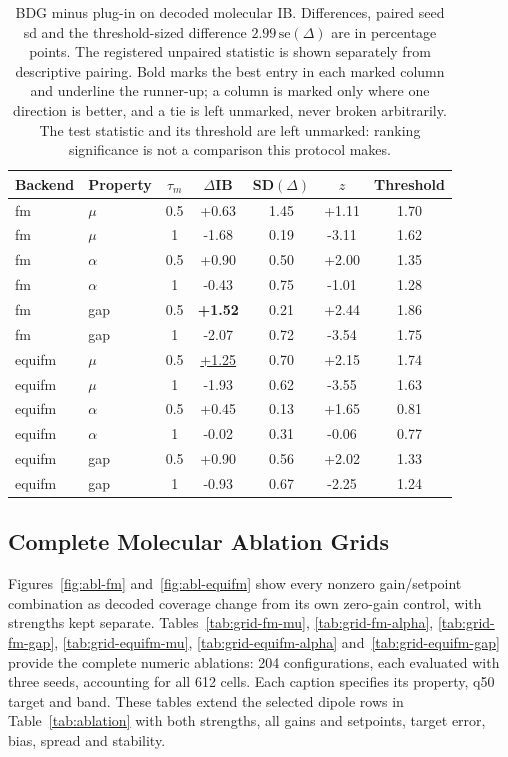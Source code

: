 \documentclass{article}
\begin{document}
\begin{table}[!htbp]
\centering\small
\caption{BDG minus plug-in on decoded molecular IB. Differences, paired seed sd and the threshold-sized difference $2.99\,\mathrm{se}(\Delta)$ are in percentage points. The registered unpaired statistic is shown separately from descriptive pairing. Bold marks the best entry in each marked column and underline the runner-up; a column is marked only where one direction is better, and a tie is left unmarked, never broken arbitrarily. The test statistic and its threshold are left unmarked: ranking significance is not a comparison this protocol makes.}
\label{tab:contrasts}
\begin{tabular}{llccccc}
\toprule
Backend & Property & $\tau_m$ & $\Delta$IB & SD$(\Delta)$ & $z$ & Threshold\\
\midrule
fm & $\mu$ & 0.5 & +0.63 & 1.45 & +1.11 & 1.70\\
fm & $\mu$ & 1 & -1.68 & 0.19 & -3.11 & 1.62\\
fm & $\alpha$ & 0.5 & +0.90 & 0.50 & +2.00 & 1.35\\
fm & $\alpha$ & 1 & -0.43 & 0.75 & -1.01 & 1.28\\
fm & gap & 0.5 & \textbf{+1.52}& 0.21 & +2.44 & 1.86\\
fm & gap & 1 & -2.07 & 0.72 & -3.54 & 1.75\\
equifm & $\mu$ & 0.5 & \underline{+1.25}& 0.70 & +2.15 & 1.74\\
equifm & $\mu$ & 1 & -1.93 & 0.62 & -3.55 & 1.63\\
equifm & $\alpha$ & 0.5 & +0.45 & 0.13 & +1.65 & 0.81\\
equifm & $\alpha$ & 1 & -0.02 & 0.31 & -0.06 & 0.77\\
equifm & gap & 0.5 & +0.90 & 0.56 & +2.02 & 1.33\\
equifm & gap & 1 & -0.93 & 0.67 & -2.25 & 1.24\\
\bottomrule
\end{tabular}
\end{table}

\subsection{Complete Molecular Ablation Grids}\label{app:ablations}
Figures~\ref{fig:abl-fm} and~\ref{fig:abl-equifm} show every nonzero gain/setpoint combination as decoded coverage change from its own zero-gain control, with strengths kept separate. Tables~\ref{tab:grid-fm-mu}, \ref{tab:grid-fm-alpha}, \ref{tab:grid-fm-gap}, \ref{tab:grid-equifm-mu}, \ref{tab:grid-equifm-alpha} and~\ref{tab:grid-equifm-gap} provide the complete numeric ablations: 204 configurations, each evaluated with three seeds, accounting for all 612 cells. Each caption specifies its property, q50 target and band. These tables extend the selected dipole rows in Table~\ref{tab:ablation} with both strengths, all gains and setpoints, target error, bias, spread and stability.
\end{document}
